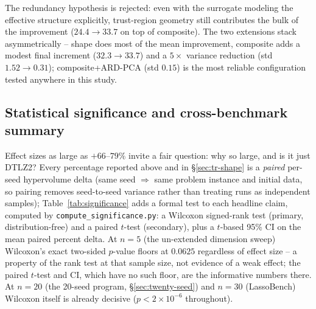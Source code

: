 \documentclass[11pt]{article}
\begin{document}
The redundancy hypothesis is rejected: even with the surrogate modeling
the effective structure explicitly, trust-region geometry still
contributes the bulk of the improvement ($24.4 \to 33.7$ on top of
composite). The two extensions stack asymmetrically -- shape does most of
the mean improvement, composite adds a modest final increment
($32.3 \to 33.7$) and a $5\times$ variance reduction (std $1.52 \to
0.31$); composite+ARD-PCA (std $0.15$) is the most reliable configuration
tested anywhere in this study.

\subsection{Statistical significance and cross-benchmark summary}
\label{sec:significance}

Effect sizes as large as $+66$--$79\%$ invite a fair question: why so
large, and is it just DTLZ2? Every percentage reported above and in
\S\ref{sec:tr-shape} is a \emph{paired} per-seed hypervolume delta (same
seed $\Rightarrow$ same problem instance and initial data, so pairing
removes seed-to-seed variance rather than treating runs as independent
samples); Table~\ref{tab:significance} adds a formal test to each headline
claim, computed by \texttt{compute\_significance.py}: a Wilcoxon
signed-rank test (primary, distribution-free) and a paired $t$-test
(secondary), plus a $t$-based 95\% CI on the mean paired percent delta. At
$n{=}5$ (the un-extended dimension sweep) Wilcoxon's exact two-sided
$p$-value floors at $0.0625$ regardless of effect size -- a property of
the rank test at that sample size, not evidence of a weak effect; the
paired $t$-test and CI, which have no such floor, are the informative
numbers there. At $n{=}20$ (the 20-seed program, \S\ref{sec:twenty-seed})
and $n{=}30$ (LassoBench) Wilcoxon itself is already decisive
($p < 2 \times 10^{-6}$ throughout).
\end{document}
